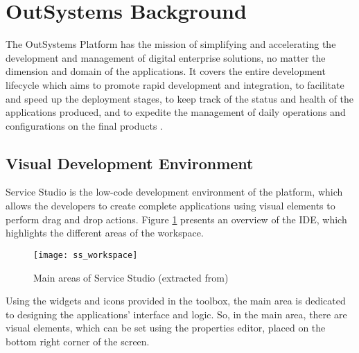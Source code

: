 

\section{OutSystems Background}
\label{sec:outsystems_background}

The OutSystems Platform has the mission of simplifying and accelerating the development and management of digital enterprise solutions, no matter the dimension and domain of the applications. It covers the entire development lifecycle which aims to promote rapid development and integration, to facilitate and speed up the deployment stages, to keep track of the status and health of the applications produced, and to expedite the management of daily operations and configurations on the final products \cite{eg_developingWithOutsystems}.

\subsection{Visual Development Environment}
\label{subsec:visual_development_environment}

Service Studio is the low-code development environment of the platform, which allows the developers to create complete applications using visual elements to perform drag and drop actions. Figure \ref{fig:ss_workspace} presents an overview of the \gls{IDE}, which highlights the different areas of the workspace.

\begin{figure}[htbp]
	\centering
	\texttt{[image: ss\_workspace]}
	\caption{Main areas of Service Studio (extracted from\cite{serviceStudioOverview})}
	\label{fig:ss_workspace}
\end{figure}

Using the widgets and icons provided in the toolbox, the main area is dedicated to designing the applications’ interface and logic. So, in the main area, there are visual elements, which can be set using the properties editor, placed on the bottom right corner of the screen. 

